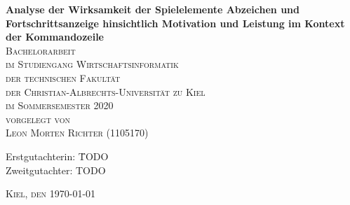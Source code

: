 \begin{titlepage}
\begin{center}


{ \Large \bfseries
Analyse der Wirksamkeit der Spielelemente Abzeichen und Fortschrittsanzeige hinsichtlich Motivation und Leistung im Kontext der Kommandozeile
}\\[2.5cm]

\textsc{ Bachelorarbeit}\\[2.0cm]

\textsc{ 
im Studiengang Wirtschaftsinformatik \\
der technischen Fakultät \\
der Christian-Albrechts-Universität zu Kiel \\
im Sommersemester 2020 
}\\[2.5cm]

\textsc{ 
vorgelegt von \\
Leon Morten Richter (1105170)
}\\[2.5cm]

\vfill

\begin{flushleft}
    \begin{tabbing}
        Erstgutachterin: \=  TODO\\
        Zweitgutachter: \> TODO \\[1.25cm]
    \end{tabbing}
\textsc{Kiel, den \today}
\end{flushleft}

\end{center}
\end{titlepage}